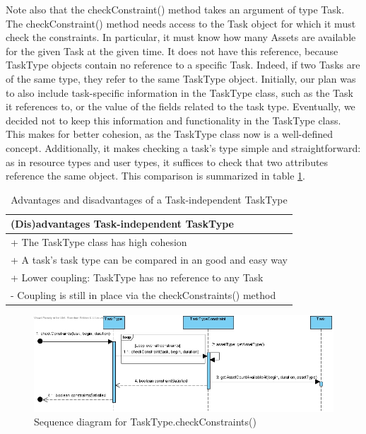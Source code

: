 				Note also that the checkConstraint() method takes an argument of type Task. The checkConstraint() method needs access to the Task object for which it must check the constraints. In particular, it must know how many Assets are available for the given Task at the given time. It does not have this reference, because TaskType objects contain no reference to a specific Task. Indeed, if two Tasks are of the same type, they refer to the same TaskType object. Initially, our plan was to also include task-specific information in the TaskType class, such as the Task it references to, or the value of the fields related to the task type. Eventually, we decided not to keep this information and functionality in the TaskType class. This makes for better cohesion, as the TaskType class now is a well-defined concept. Additionally, it makes checking a task's type simple and straightforward: as in resource types and user types, it suffices to check that two attributes reference the same object. This comparison is summarized in table \ref{Independent TT}.
			
			\begin{table}
			\begin{tabular}{|l|}
				\hline
				(Dis)advantages Task-independent TaskType \\
				\hline
				+ The TaskType class has high cohesion \\
				+ A task's task type can be compared in an good and easy way \\
				+ Lower coupling: TaskType has no reference to any Task \\
				\hline
				- Coupling is still in place via the checkConstraints() method\\
				\hline
			\end{tabular}

			\caption{Advantages and disadvantages of a Task-independent TaskType}
						\label{Independent TT}
			\end{table}
			
						\begin{figure}
			\includegraphics[scale=0.5]{images/checkConstraints().jpg}
			\caption{Sequence diagram for TaskType.checkConstraints()}
						\label{checkConstraints}
			\end{figure}
			
